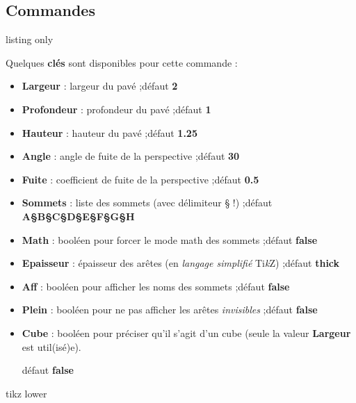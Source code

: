 \documentclass[a4paper,french,11pt]{article}
\providecommand\tikzlogo{Ti\textit{k}Z}
\let\TikZ\tikzlogo
\newcommand\Cle[1]{{\bfseries\sffamily\textlangle \textcolor{orange!75!black}{#1}\textrangle}}
\begin{document}
\subsection{Commandes}

\begin{PresCodeTexPL}{listing only}
\end{PresCodeTexPL}

\begin{cautionblock}
Quelques \Cle{clés} sont disponibles pour cette commande :

\begin{itemize}
	\item \Cle{Largeur} : largeur du pavé ;\hfill{}défaut \Cle{2}
	\item \Cle{Profondeur} : profondeur du pavé ;\hfill{}défaut \Cle{1}
	\item \Cle{Hauteur} : hauteur du pavé ;\hfill{}défaut \Cle{1.25}
	\item \Cle{Angle} : angle de fuite de la perspective ;\hfill{}défaut \Cle{30}
	\item \Cle{Fuite} : coefficient de fuite de la perspective ;\hfill{}défaut \Cle{0.5}
	\item \Cle{Sommets} : liste des sommets (avec délimiteur § !) ;\hfill{}défaut \Cle{A§B§C§D§E§F§G§H}
	\item \Cle{Math} : booléen pour forcer le mode math des sommets ;\hfill{}défaut \Cle{false}
	\item \Cle{Epaisseur} : épaisseur des arêtes (en \textit{langage simplifié} \TikZ) ;\hfill{}défaut \Cle{thick}
	\item \Cle{Aff} : booléen pour afficher les noms des sommets ;\hfill{}défaut \Cle{false}
	\item \Cle{Plein} : booléen pour ne pas afficher les arêtes \textit{invisibles} ;\hfill{}défaut \Cle{false}
	\item \Cle{Cube} : booléen pour préciser qu'il s'agit d'un cube (seule la valeur \Cle{Largeur} est util(isé)e).
	
	\hfill{}défaut \Cle{false}
\end{itemize}
\vspace*{-\baselineskip}\leavevmode
\end{cautionblock}

\begin{PresCodePL}{tikz lower}
\PaveTikz
\end{PresCodePL}
\end{document}
